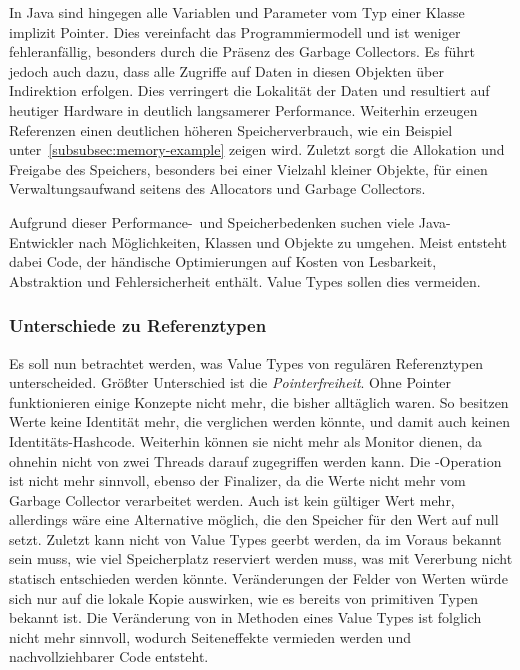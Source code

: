 In Java sind hingegen alle Variablen und Parameter vom Typ einer Klasse implizit Pointer.
Dies vereinfacht das Programmiermodell und ist weniger fehleranfällig, besonders durch die Präsenz des Garbage Collectors.
Es führt jedoch auch dazu, dass alle Zugriffe auf Daten in diesen Objekten über Indirektion erfolgen.
Dies verringert die Lokalität der Daten und resultiert auf heutiger Hardware in deutlich langsamerer Performance.
Weiterhin erzeugen Referenzen einen deutlichen höheren Speicherverbrauch, wie ein Beispiel unter~\ref{subsubsec:memory-example} zeigen wird.
Zuletzt sorgt die Allokation und Freigabe des Speichers, besonders bei einer Vielzahl kleiner Objekte, für einen Verwaltungsaufwand seitens des Allocators und Garbage Collectors.

Aufgrund dieser Performance-\ und Speicherbedenken suchen viele Java-Entwickler nach Möglichkeiten, Klassen und Objekte zu umgehen.
Meist entsteht dabei Code, der händische Optimierungen auf Kosten von Lesbarkeit, Abstraktion und Fehlersicherheit enthält.
Value Types sollen dies vermeiden.

\subsubsection{Unterschiede zu Referenztypen}

Es soll nun betrachtet werden, was Value Types von regulären Referenztypen unterscheided.
Größter Unterschied ist die \emph{Pointerfreiheit}.
Ohne Pointer funktionieren einige Konzepte nicht mehr, die bisher alltäglich waren.
So besitzen Werte keine Identität mehr, die verglichen werden könnte, und damit auch keinen Identitäts-Hashcode.
Weiterhin können sie nicht mehr als Monitor dienen, da ohnehin nicht von zwei Threads darauf zugegriffen werden kann.
Die -Operation ist nicht mehr sinnvoll, ebenso der Finalizer, da die Werte nicht mehr vom Garbage Collector verarbeitet werden.
Auch  ist kein gültiger Wert mehr, allerdings wäre eine Alternative möglich, die den Speicher für den Wert auf null setzt.
Zuletzt kann nicht von Value Types geerbt werden, da im Voraus bekannt sein muss, wie viel Speicherplatz reserviert werden muss, was mit Vererbung nicht statisch entschieden werden könnte.
Veränderungen der Felder von Werten würde sich nur auf die lokale Kopie auswirken, wie es bereits von primitiven Typen bekannt ist.
Die Veränderung von  in Methoden eines Value Types ist folglich nicht mehr sinnvoll, wodurch Seiteneffekte vermieden werden und nachvollziehbarer Code entsteht.

